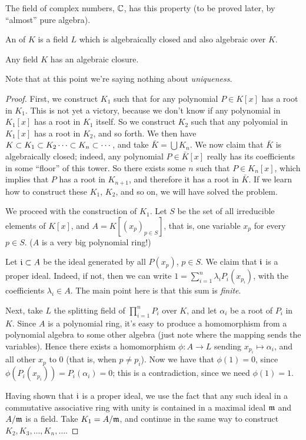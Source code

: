 \begin{ex}
The field of complex numbers, $\mathbb{C}$, has this property (to be proved later, by ``almost'' pure algebra).
\end{ex}

\begin{defn}
An  of $K$ is a field $L$ which is algebraically closed and also algebraic over $K$.
\end{defn}

\begin{thm}
Any field $K$ has an algebraic closure.
\end{thm}
Note that at this point we're saying nothing about \emph{uniqueness}.
\begin{proof}
First, we construct $K_1$ such that for any polynomial $P \in K[x]$ has a root in $K_1$. This is not yet a victory, because we don't know if any polynomial in $K_1[x]$ has a root in $K_1$ itself. So we construct $K_2$ such that any polyomial in $K_1[x]$ has a root in $K_2$, and so forth. We then have $K \subset K_1 \subset K_2 \dotsb \subset K_n \subset \dotsb$, and take $\bar{K} = \bigcup K_n$. We now claim that $\bar{K}$ is algebraically closed; indeed, any polynomial $P \in \bar{K}[x]$ really has its coefficients in some ``floor'' of this tower. So there exists some $n$ such that $P \in K_n[x]$, which implies that $P$ has a root in $K_{n+1}$, and therefore it has a root in $\bar{K}$. If we learn how to construct these $K_1$, $K_2$, and so on, we will have solved the problem.

We proceed with the construction of $K_1$. Let $S$ be the set of all irreducible elements of $K[x]$, and $A = K[(x_p)_{p \in S}]$, that is, one variable $x_p$ for every $p \in S$. 
($A$ is a very big polynomial ring!)

Let $\mathfrak{i} \subset A$ be the ideal generated by all $P(x_p)$, $p \in S$. 
We claim that $\mathfrak{i}$ is a proper ideal. 
Indeed, if not, then we can write $1 = \sum_{i=1}^{n} \lambda_i P_i(x_{p_i})$, with the coefficients $\lambda_i \in A$. 
The main point here is that this sum is \emph{finite}. 

Next, take $L$ the splitting field of $\prod_{i=1}^{n} P_i$ over $K$, and let $\alpha_i$ be a root of $P_i$ in $K$. 
Since $A$ is a polynomial ring, it's easy to produce a homomorphism from a polynomial algebra to some other algebra (just note where the mapping sends the variables). 
Hence there exists a homomorphism $\phi: A \to L$ sending $x_{p_i} \mapsto \alpha_i$, and all other $x_p$ to $0$ (that is, when $p \neq p_i$). 
Now we have that $\phi(1) = 0$, since $\phi(P_i(x_{p_i})) = P_i(\alpha_i) = 0$; this is a contradiction, since we need $\phi(1) = 1$.

Having shown that $\mathfrak{i}$ is a proper ideal, we use the fact that any such ideal in a commutative associative ring with unity is contained in a maximal ideal $\mathfrak{m}$ and $A / \mathfrak{m}$ is a field. Take $K_1 = A / \mathfrak{m}$, and continue in the same way to construct $K_2, K_3, \dotsc, K_n, \dotsc$.
\end{proof}

